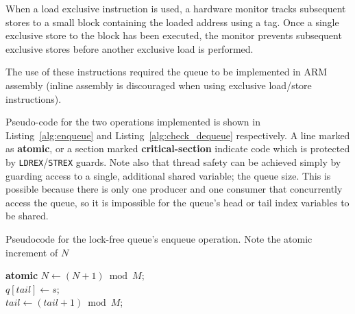 \documentclass[11pt,a4paper,twocolumn]{scrartcl}
\begin{document}
When a load exclusive instruction is used, a hardware monitor tracks subsequent stores to a small block containing the loaded address using a tag. Once a single exclusive store to the block has been executed, the monitor prevents subsequent exclusive stores before another exclusive load is performed.\cite{armv7_m_architecture_manual}

The use of these instructions required the queue to be implemented in ARM assembly (inline assembly is discouraged when using exclusive load/store instructions).

Pseudo-code for the two operations implemented is shown in Listing~\ref{alg:enqueue} and Listing~\ref{alg:check_dequeue} respectively. A line marked as \textbf{atomic}, or a section marked \textbf{critical-section} indicate code which is protected by \verb!LDREX!/\verb!STREX! guards. Note also that thread safety can be achieved simply by guarding access to a single, additional shared variable; the queue size. This is possible because there is only one producer and one consumer that concurrently access the queue, so it is impossible for the queue's head or tail index variables to be shared.

\begin{algorithm}
   \caption{Pseudocode for the lock-free queue's enqueue operation. Note the atomic increment of $N$}\label{alg:enqueue}
      \textbf{atomic} $N \gets (N + 1) \bmod M$; \\
      $q[tail] \gets s$; \\
      $tail \gets (tail + 1) \bmod M$;
\end{algorithm}
\end{document}

